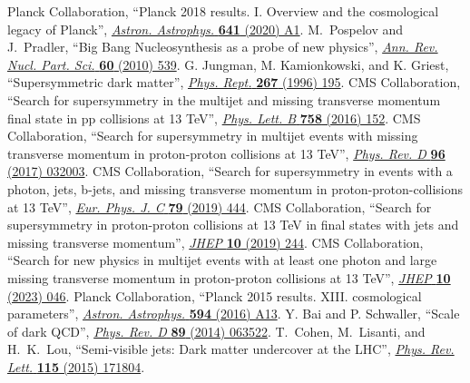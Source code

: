 \begin{thebibliography}{99}
 Planck Collaboration, ``Planck 2018 results. I. Overview and the cosmological legacy of Planck'', \href{http://dx.doi.org/10.1051/0004-6361/201833880}{\textit{Astron. Astrophys.} \textbf{641} (2020) A1}.
 M.~Pospelov and J.~Pradler, ``Big Bang Nucleosynthesis as a probe of new physics'', \href{http://dx.doi.org/10.1146/annurev.nucl.012809.104521}{\textit{Ann. Rev. Nucl. Part. Sci.} \textbf{60} (2010) 539}.
 G. Jungman, M. Kamionkowski, and K. Griest, ``Supersymmetric dark matter'', \href{https://doi.org/10.1016/0370-1573(95)00058-5}{\textit{Phys. Rept.} \textbf{267} (1996) 195}.
 CMS Collaboration, ``Search for supersymmetry in the multijet and missing transverse momentum final state in pp collisions at 13 TeV'', \href{http://dx.doi.org/10.1016/j.physletb.2016.05.002}{\textit{Phys. Lett. B} \textbf{758} (2016) 152}.
 CMS Collaboration, ``Search for supersymmetry in multijet events with missing transverse momentum in proton-proton collisions at 13 TeV'', \href{http://dx.doi.org/10.1103/PhysRevD.96.032003}{\textit{Phys. Rev. D} \textbf{96} (2017) 032003}.
 CMS Collaboration, ``Search for supersymmetry in events with a photon, jets, b-jets, and missing transverse momentum in proton-proton-collisions at 13 TeV'', \href{http://dx.doi.org/10.1140/epjc/s10052-019-6926-x}{\textit{Eur. Phys. J. C} \textbf{79} (2019) 444}.
 CMS Collaboration, ``Search for supersymmetry in proton-proton collisions at 13 TeV in final states with jets and missing transverse momentum'', \href{http://dx.doi.org/10.1007/JHEP10(2019)244}{\textit{JHEP} \textbf{10} (2019) 244}.
 CMS Collaboration, ``Search for new physics in multijet events with at least one photon and large missing transverse momentum in proton-proton collisions at 13 TeV'', \href{http://dx.doi.org/10.1007/JHEP10(2023)046}{\textit{JHEP} \textbf{10} (2023) 046}.
 {Planck} Collaboration, ``{Planck} 2015 results. XIII. cosmological parameters'', \href{http://dx.doi.org/10.1051/0004-6361/201525830}{\textit{Astron. Astrophys.} \textbf{594} (2016) A13}.
 Y. Bai and P. Schwaller, ``Scale of dark QCD'', \href{https://doi.org/10.1103/PhysRevD.89.063522}{\textit{Phys. Rev. D} \textbf{89} (2014) 063522}.
 T.~Cohen, M.~Lisanti, and H.~K.~Lou, ``Semi-visible jets: Dark matter undercover at the {LHC}'', \href{https://doi.org/10.1103/PhysRevLett.115.171804}{\textit{Phys. Rev. Lett.} \textbf{115} (2015) 171804}.

\end{thebibliography}
